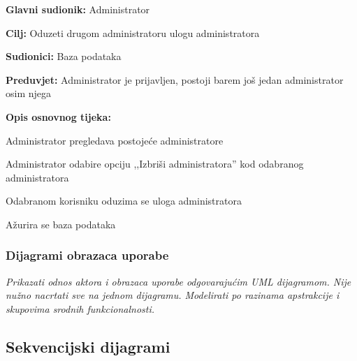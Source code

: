 						\noindent {}
						\begin{packed_item}
							
							\item \textbf{Glavni sudionik: }Administrator
							\item  \textbf{Cilj: }Oduzeti drugom administratoru ulogu administratora
							\item  \textbf{Sudionici: }Baza podataka
							\item  \textbf{Preduvjet: }Administrator je prijavljen, postoji barem još jedan administrator osim njega
							\item  \textbf{Opis osnovnog tijeka:}
							
							\item[] \begin{packed_enum}
								
								\item Administrator pregledava postojeće administratore
								\item Administrator odabire opciju ,,Izbriši administratora” kod odabranog administratora
								\item Odabranom korisniku oduzima se uloga administratora
								\item Ažurira se baza podataka
		 
							\end{packed_enum}
							
							
						\end{packed_item}
						
					
				\subsubsection{Dijagrami obrazaca uporabe}
					
					\textit{Prikazati odnos aktora i obrazaca uporabe odgovarajućim UML dijagramom. Nije nužno nacrtati sve na jednom dijagramu. Modelirati po razinama apstrakcije i skupovima srodnih funkcionalnosti.}
				\eject		
				
			\subsection{Sekvencijski dijagrami}

